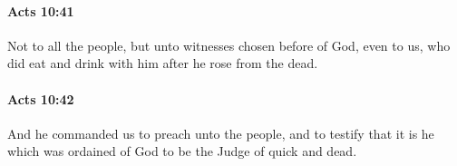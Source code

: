 		\paragraph{Acts 10:41} %
			\label{ACTS-10-41}

			Not to all the people, but unto witnesses chosen before of God, even to us, who did eat and drink with him after he rose from the dead.

			\begin{framed}
			\scriptsize
				\begin{compactdesc}
					\item[SBLG] 
				\end{compactdesc}
			\end{framed}

		\paragraph{Acts 10:42} %
			\label{ACTS-10-42}

			And he commanded us to preach unto the people, and to testify that it is he which was ordained of God to be the Judge of quick and dead.

